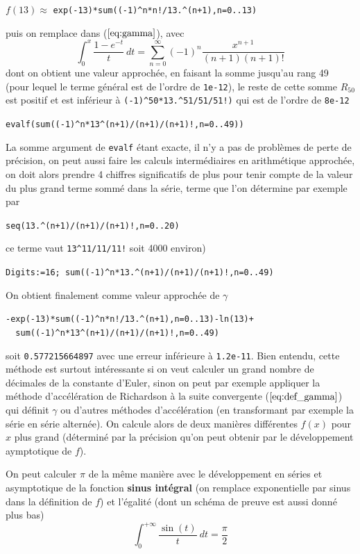 \documentclass[a4paper,11pt]{article}
\begin{document}
\begin{giacjshere}
\begin{center}
$f(13) \approx$ \verb|exp(-13)*sum((-1)^n*n!/13.^(n+1),n=0..13)|
\end{center}
puis on remplace dans (\(\ref{eq:gamma}\)), avec 
\[ \int_0^{x} \frac{1-e^{-t}}{t} \ dt = 
\sum_{n=0}^{\infty} (-1)^n \frac{x^{n+1}}{(n+1) (n+1)!}\]
dont on obtient une valeur approch\'ee, 
en faisant la somme jusqu'au rang 49 (pour lequel
le terme g\'en\'eral est de l'ordre de \verb|1e-12|),
le reste de cette somme $R_{50}$ est positif et est inf\'erieur \`a
{\tt (-1)\verb|^|50*13.\verb|^|51/51/51!)} qui est de l'ordre de 
\verb|8e-12|
\begin{center}
\verb|evalf(sum((-1)^n*13^(n+1)/(n+1)/(n+1)!,n=0..49))|
\end{center}
La somme argument de \verb|evalf|
\'etant exacte, il n'y a pas de probl\`emes de perte de pr\'ecision,
on peut aussi faire les calculs interm\'ediaires en arithm\'etique approch\'ee,
on doit alors prendre 4 chiffres significatifs de plus
pour tenir compte de la valeur du plus grand terme
somm\'e dans la s\'erie, terme que l'on d\'etermine par exemple par
\begin{center}
{\tt seq(13.\verb|^|(n+1)/(n+1)/(n+1)!,n=0..20)}
\end{center} 
ce terme vaut \verb|13^11/11/11!| soit 4000 environ)
\begin{center}
\verb|Digits:=16; sum((-1)^n*13.^(n+1)/(n+1)/(n+1)!,n=0..49)|
\end{center}
On obtient finalement comme valeur approch\'ee de $\gamma$
\begin{center}
\verb|-exp(-13)*sum((-1)^n*n!/13.^(n+1),n=0..13)-ln(13)+|\\
\verb|  sum((-1)^n*13^(n+1)/(n+1)/(n+1)!,n=0..49)|
\end{center}
soit \verb|0.577215664897| avec une erreur inf\'erieure \`a \verb|1.2e-11|.
Bien entendu, cette m\'ethode est surtout int\'eressante si on veut calculer
un grand nombre de d\'ecimales de la constante d'Euler, sinon
on peut par exemple appliquer la m\'ethode d'acc\'el\'eration de Richardson \`a
la suite convergente (\(\ref{eq:def_gamma}\)) qui d\'efinit $\gamma$
ou d'autres m\'ethodes d'acc\'el\'eration (en transformant par
exemple la s\'erie en s\'erie altern\'ee). On calcule alors
de deux mani\`eres diff\'erentes $f(x)$ pour $x$ plus grand (d\'etermin\'e
par la pr\'ecision qu'on peut obtenir par le d\'eveloppement
aymptotique de $f$).

On peut calculer $\pi$ de la même manière avec le développement 
en séries et asymptotique
de la fonction {\bf sinus intégral} (on remplace exponentielle par sinus dans
la définition de $f$) et l'égalité (dont un sch\'ema de preuve est aussi
donn\'e plus bas)
\begin{equation} \label{eq:Siinf}
 \int_0^{+\infty} \frac{\sin(t)}{t} \ dt = \frac{\pi}{2}
\end{equation}


\end{giacjshere}
\end{document}
